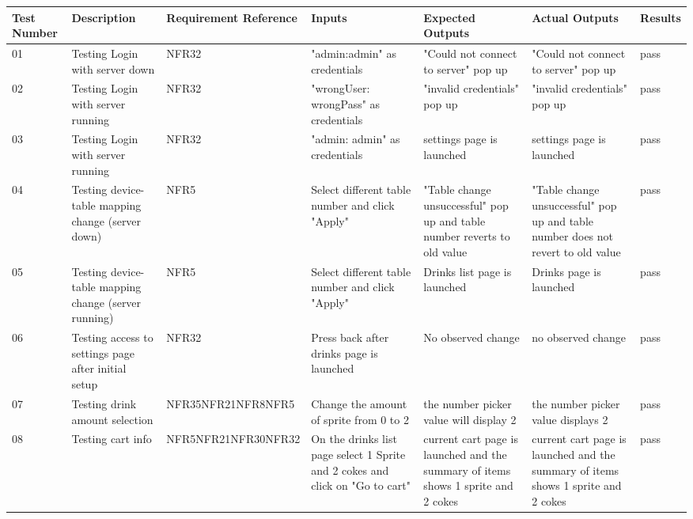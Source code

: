\documentclass [10pt]{article}
\begin{document}
	\begin{longtable}{| p{} | p{} | p{} | p{} | p{} | p{} | p{} |}\hline 
		\rowcolor{tableCell}\textbf{Test Number} & \textbf{Description} & \textbf{Requirement Reference} & \textbf{Inputs} & \textbf{Expected Outputs} & \textbf{Actual Outputs}& \textbf{Results} \\ \hline

01 &  Testing Login with server down &  NFR32 &  "admin:admin" as credentials &  "Could not connect to server" pop up &  "Could not connect to server" pop up &  pass
\\ \hline  
02 &  Testing Login with server running &  NFR32 &  "wrongUser: wrongPass" as credentials &  "invalid credentials" pop up &  "invalid credentials" pop up &  pass
\\ \hline  
03 &  Testing Login with server running &  NFR32 &  "admin: admin" as credentials &  settings page is launched &  settings page is launched &  pass
\\ \hline  
04 &  Testing device-table mapping change (server down) &  NFR5 &  Select different table number and click "Apply" &  "Table change unsuccessful" pop up and table number reverts to old value &  "Table change unsuccessful" pop up and table number does not revert to old value &  pass
\\ \hline  
05 &  Testing device-table mapping change (server running) &  NFR5 &  Select different table number and click "Apply" &  Drinks list page is launched &  Drinks page is launched &  pass
\\ \hline  
06 &  Testing access to settings page after initial setup &  NFR32 &  Press back after drinks page is launched &  No observed change &  no observed change &  pass
\\ \hline  
07 &  Testing drink amount selection &  NFR35\newline NFR21\newline NFR8\newline NFR5 &  Change the amount of sprite from 0 to 2 &  the number picker value will display 2 &  the number picker value displays 2 &  pass
\\ \hline  
08 &  Testing cart info &  NFR5\newline NFR21\newline NFR30\newline NFR32 &  On the drinks list page select 1 Sprite and 2 cokes and click on "Go to cart" &  current cart page is launched and the summary of items shows 1 sprite and 2 cokes &  current cart page is launched and the summary of items shows 1 sprite and 2 cokes &  pass\\ \hline  

\end{longtable}
\end{document}
